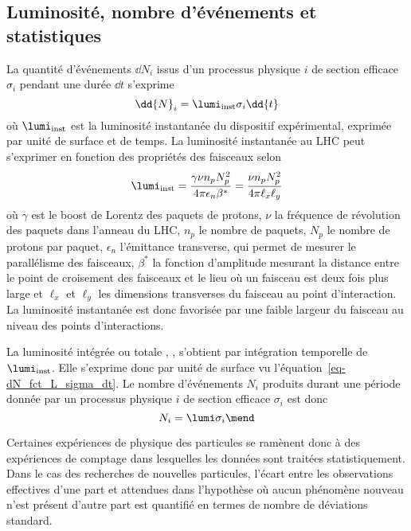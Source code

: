 \subsection{Luminosité, nombre d'événements et statistiques}\label{chapter-LHC-section-LHC-subsec-lumi}
La quantité d'événements $\dd{N}_i$ issus d'un processus physique $i$ de section efficace $\sigma_i$ pendant une durée $\dd{t}$ s'exprime
\begin{equation}
\dd{N}_i = \lumi_\text{inst} \sigma_i \dd{t}
\label{eq-dN_fct_L_sigma_dt}
\end{equation}
où $\lumi_\text{inst}$ est la luminosité instantanée du dispositif expérimental, exprimée par unité de surface et de temps.
La luminosité instantanée au LHC peut s'exprimer en fonction des propriétés des faisceaux selon
\begin{equation}
\lumi_\text{inst}
= \frac{\gamma\nu n_p N_p^2}{4\pi\epsilon_n\beta^*}
= \frac{\nu n_p N_p^2}{4\pi\ell_x\ell_y}
\end{equation}
où
$\gamma$ est le boost de Lorentz des paquets de protons,
$\nu$ la fréquence de révolution des paquets dans l'anneau du LHC,
$n_p$ le nombre de paquets,
$N_p$ le nombre de protons par paquet,
$\epsilon_n$ l'émittance transverse, qui permet de mesurer le parallélisme des faisceaux,
$\beta^*$ la fonction d'amplitude mesurant la distance entre le point de croisement des faisceaux et le lieu où un faisceau est deux fois plus large et
$\ell_x$ et $\ell_y$ les dimensions transverses du faisceau au point d'interaction.
La luminosité instantanée est donc favorisée par une faible largeur du faisceau au niveau des points d'interactions.
\par
La luminosité intégrée ou \og totale \fg, \lumi, s'obtient par intégration temporelle de $\lumi_\text{inst}$.
Elle s'exprime donc par unité de surface vu l'équation~\eqref{eq-dN_fct_L_sigma_dt}.
Le nombre d'événements $N_i$ produits durant une période donnée par un processus physique $i$ de section efficace $\sigma_i$ est donc
\begin{equation}
N_i = \lumi \sigma_i
\mend
\end{equation}
\par Certaines expériences de physique des particules se ramènent donc à des expériences de comptage dans lesquelles les données sont traitées statistiquement.
Dans le cas des recherches de nouvelles particules, l'écart entre les observations effectives d'une part et attendues dans l'hypothèse où aucun phénomène nouveau n'est présent d'autre part est quantifié en termes de nombre de déviations standard.
